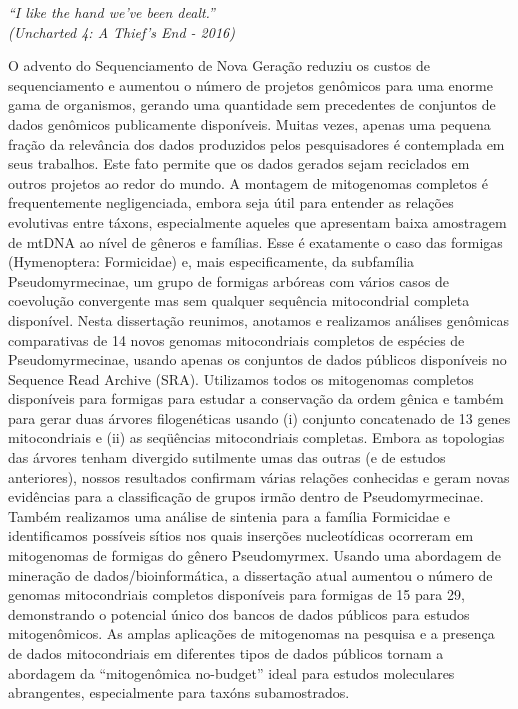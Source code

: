 \documentclass[
	12pt,				%
	oneside,
	a4paper,			%
	english,			%
	spanish,			%
	brazil				%
	]{abntex2}
\begin{document}
\begin{epigrafe}
    \vspace*{\fill}
	\begin{flushright}
		\textit{
		``I like the hand we’ve been dealt.'' \\
		(Uncharted 4: A Thief’s End - 2016)
	}
	\end{flushright}
\end{epigrafe}


\setlength{\absparsep}{18pt} %
\begin{resumo}
 O advento do Sequenciamento de Nova Geração reduziu os custos de sequenciamento e aumentou o número de projetos genômicos para uma enorme gama de organismos, gerando uma quantidade sem precedentes de conjuntos de dados genômicos publicamente disponíveis. Muitas vezes, apenas uma pequena fração da relevância dos dados produzidos pelos pesquisadores é contemplada em seus trabalhos. Este fato permite que os dados gerados sejam reciclados em outros projetos ao redor do mundo. A montagem de mitogenomas completos é frequentemente negligenciada, embora seja útil para entender as relações evolutivas entre táxons, especialmente aqueles que apresentam baixa amostragem de mtDNA ao nível de gêneros e famílias. Esse é exatamente o caso das formigas (Hymenoptera: Formicidae) e, mais especificamente, da subfamília Pseudomyrmecinae, um grupo de formigas arbóreas com vários casos de coevolução convergente mas sem qualquer sequência mitocondrial completa disponível. Nesta dissertação reunimos, anotamos e realizamos análises genômicas comparativas de 14 novos genomas mitocondriais completos de espécies de Pseudomyrmecinae,  usando apenas os conjuntos de dados públicos disponíveis no Sequence Read Archive (SRA). Utilizamos todos os mitogenomas completos disponíveis para formigas para estudar a conservação da ordem gênica e também para gerar duas árvores filogenéticas usando (i) conjunto concatenado de 13 genes mitocondriais e (ii) as seqüências mitocondriais completas. Embora as topologias das árvores tenham divergido sutilmente umas das outras (e de estudos anteriores), nossos resultados confirmam várias relações conhecidas e geram novas evidências para a classificação de grupos irmão dentro de Pseudomyrmecinae. Também realizamos uma análise de sintenia para a família Formicidae e identificamos possíveis sítios nos quais inserções nucleotídicas ocorreram em mitogenomas de formigas do gênero Pseudomyrmex. Usando uma abordagem de mineração de dados/bioinformática, a dissertação atual aumentou o número de genomas mitocondriais completos disponíveis para formigas de 15 para 29, demonstrando o potencial único dos bancos de dados públicos para estudos mitogenômicos. As amplas aplicações de mitogenomas na pesquisa e a presença de dados mitocondriais em diferentes tipos de dados públicos tornam a abordagem da “mitogenômica no-budget” ideal para estudos moleculares abrangentes, especialmente para taxóns subamostrados.


\end{resumo}
\end{document}
